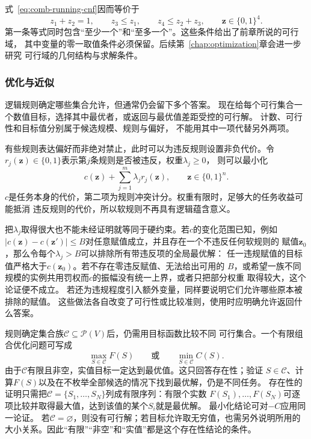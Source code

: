 式~\eqref{eq:comb-running-cnf}因而等价于
\begin{equation}
  z_1+z_2=1,\qquad
  z_3\leq z_1,\qquad
  z_4\leq z_2+z_3,\qquad
  \bm{z}\in\{0,1\}^4.
  \label{eq:comb-running-integer-constraints}
\end{equation}
第一条等式同时包含“至少一个”和“至多一个”。这些条件给出了前章所说的可行域，
其中变量的零一取值条件必须保留。后续第~\ref{chap:optimization}章会进一步研究
可行域的几何结构与求解条件。

\subsubsection{优化与近似}
\label{sec:comb-optimization-submodularity}

逻辑规则确定哪些集合允许，但通常仍会留下多个答案。
现在给每个可行集合一个数值目标，选择其中最优者，或返回与最优值差距受控的可行解。
计数、可行性和目标值分别属于候选规模、规则与偏好，
不能用其中一项代替另外两项。

有些规则表达偏好而非绝对禁止，此时可以为违反规则设置非负代价。令
$r_j(\bm{z})\in\{0,1\}$表示第$j$条规则是否被违反，权重$\lambda_j\geq0$，
则可以最小化
\begin{equation}
  c(\bm{z})+\sum_{j=1}^{m}\lambda_j r_j(\bm{z}),
  \qquad
  \bm{z}\in\{0,1\}^n.
  \label{eq:comb-soft-constraint-objective}
\end{equation}
$c$是任务本身的代价，第二项为规则冲突计分。权重有限时，足够大的任务收益可能抵消
违反规则的代价，所以软规则不再具有逻辑蕴含意义。

把$\lambda_j$取得很大也不能未经证明就等同于硬约束。若$c$的变化范围已知，例如
$|c(\bm{z})-c(\bm{z}')|\leq B$对任意赋值成立，并且存在一个不违反任何软规则的
赋值$\bm{z}_0$，那么令每个$\lambda_j>B$可以排除所有带违反项的全局最优解：
任一违规赋值的目标值严格大于$c(\bm{z}_0)$。若不存在零违反赋值、无法给出可用的
$B$，或希望一族不同规模的实例共用罚权而$c$的振幅没有统一上界，或者只把部分权重
取得较大，这个论证便不成立。
若还为违规程度引入额外变量，同样要说明它们允许哪些原本被排除的赋值。
这些做法各自改变了可行性或比较准则，使用时应明确允许返回什么答案。

规则确定集合族$\mathcal{C}\subseteq\mathcal{P}(V)$后，仍需用目标函数比较不同
可行集合。一个有限组合优化问题可写成
\begin{equation}
  \max_{S\in\mathcal{C}}F(S)
  \qquad\text{或}\qquad
  \min_{S\in\mathcal{C}}C(S).
  \label{eq:comb-discrete-optimization}
\end{equation}
由于$\mathcal{C}$有限且非空，实值目标一定达到最优值。这只回答存在性；验证
$S\in\mathcal{C}$、计算$F(S)$以及在不枚举全部候选的情况下找到最优解，仍是不同任务。
存在性的证明只需把$\mathcal{C}=\{S_1,\ldots,S_N\}$列成有限序列：有限个实数
$F(S_1),\ldots,F(S_N)$可逐项比较并取得最大值，达到该值的某个$S_i$就是最优解。
最小化结论可对$-C$应用同一论证。
若$\mathcal{C}=\varnothing$，则没有可行解；若目标允许取无穷值，也需另外说明所用的
大小关系。因此“有限”“非空”和“实值”都是这个存在性结论的条件。

